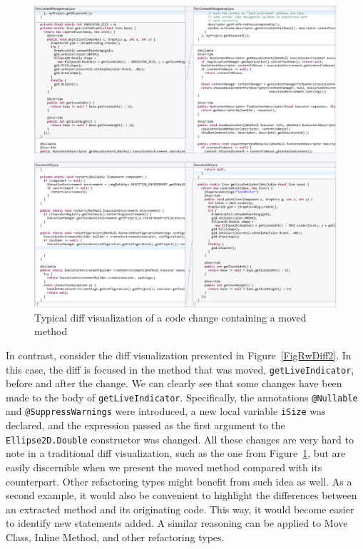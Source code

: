 \begin{figure}[htbp]
\centering
\includegraphics[width=\linewidth]{img/c1.png}
\caption{Typical diff visualization of a code change containing a moved method}
\label{FigRwDiff1}
\end{figure}


In contrast, consider the diff visualization presented in Figure~\ref{FigRwDiff2}. In this case, the diff is focused in the method that was moved, \texttt{getLiveIndicator}, before and after the change. We can clearly see that some changes have been made to the body of \texttt{getLiveIndicator}. Specifically, the annotations \texttt{@Nullable} and \texttt{@SuppressWarnings} were introduced, a new local variable \texttt{iSize} was declared, and the expression passed as the first argument to the \texttt{Ellipse2D.Double} constructor was changed.
All these changes are very hard to note in a traditional diff visualization, such as the one from Figure~\ref{FigRwDiff1}, but are easily discernible when we present the moved method compared with its counterpart.
Other refactoring types might benefit from such idea as well.
As a second example, it would also be convenient to highlight the differences between an extracted method and its originating code. This way, it would become easier to identify new statements added.
A similar reasoning can be applied to Move Class, Inline Method, and other refactoring types.


